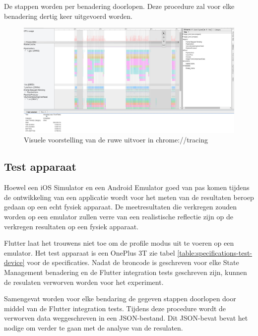 De stappen worden per benadering doorlopen. Deze procedure zal voor elke benadering dertig keer uitgevoerd worden. 

\begin{figure}[H]
    \includegraphics[width=\linewidth]{img/methodologie/chrome-tracing-timeline.jpg}
    \caption{Visuele voorstelling van de ruwe uitvoer in chrome://tracing}
    \label{fig:chrome-tracing-timeline}
\end{figure}


\subsection{Test apparaat}
Hoewel een iOS Simulator en een Android Emulator goed van pas komen tijdens de ontwikkeling van een applicatie wordt voor het meten van de resultaten beroep gedaan op een echt fysiek apparaat. De meetresultaten die verkregen zouden worden op een emulator zullen verre van een realistische reflectie zijn op de verkregen resultaten op een fysiek apparaat. \autocite{Flutter2019c}

Flutter laat het trouwens niet toe om de profile modus uit te voeren op een emulator.
Het test apparaat is een OnePlus 3T zie tabel \ref{table:specifications-test-device} voor de specificaties.
Nadat de broncode is geschreven voor elke State Management benadering en de Flutter integration tests geschreven zijn, kunnen de resulaten verworven worden voor het experiment.

Samengevat worden voor elke bendaring de gegeven stappen doorlopen door middel van de Flutter integration tests. Tijdens deze procedure wordt de verworven data weggeschreven in een JSON-bestand. Dit JSON-bevat bevat het nodige om verder te gaan met de analyse van de resulaten.

